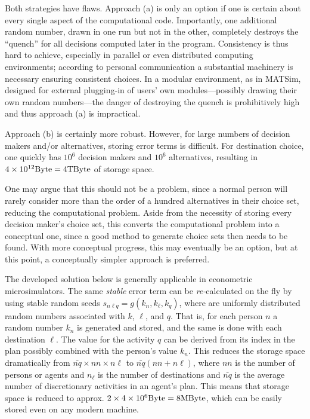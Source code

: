 Both strategies have flaws. Approach (a) is only an option if one is certain about every single aspect of the computational code. Importantly, one additional random number, drawn in one run but not in the other, completely destroys the ``quench'' for all decisions computed later in the program. Consistency is thus hard to achieve, especially in parallel or even distributed computing environments; according to personal communication a substantial machinery is necessary ensuring consistent choices. In a modular environment, as in MATSim, designed for external plugging-in of users' own modules---possibly drawing their own random numbers---the danger of destroying the quench is prohibitively high and thus approach (a) is impractical.

Approach (b) is certainly more robust. However, for large numbers of decision makers and/or alternatives, storing error terms is difficult. For destination choice, one quickly has $10^6$ decision makers and $10^6$ alternatives, resulting in $4 \times 10^{12} \hbox{Byte} = 4 \hbox{TByte}$ of storage space.

One may argue that this should not be a problem, since a normal person will rarely consider more than the order of a hundred alternatives in their choice set, reducing the computational problem. Aside from the necessity of storing every decision maker's choice set, this converts the computational problem into a conceptual one, since a good method to generate choice sets then needs to be found. With more conceptual progress, this may eventually be an option, but at this point, a conceptually simpler approach is preferred.

The developed solution below is generally applicable in econometric microsimulators. The same \emph{stable} error term can be \emph{re-}calculated on the fly by using stable random seeds $s_{n\ell q} = g(k_n, k_\ell, k_q)$, where are uniformly distributed random numbers associated with $k$, $\ell$, and $q$. That is, for each person $n$ a random number $k_n$ is generated and stored, and the same is done with each destination $\ell$. The value for the activity $q$ can be derived from its index in the plan possibly combined with the person's value $k_n$. This reduces the storage space dramatically from $\bar{nq} \times nn \times n\ell$ to $\bar{nq}(nn + n\ell)$, where $nn$ is the number of persons or agents and $n_\ell$ is the number of destinations and $\bar{nq}$ is the average number of discretionary activities in an agent's plan. This means that storage space is reduced to approx. $2 \times 4 \times 10^{6} \hbox{Byte} = 8 \hbox{MByte}$, which can be easily stored even on any modern machine.

